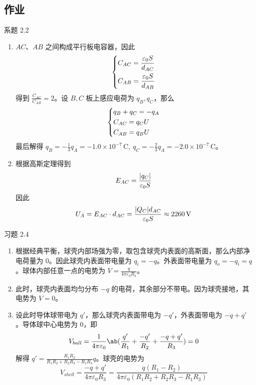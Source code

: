 \subsection{作业}

\begin{problem}
	系题 2.2
	\begin{solution}
		\begin{enumerate}
			
			\item[\textbf{1)}] $AC$、$AB$ 之间构成平行板电容器，因此
			$$
			\begin{dcases}
				C_{AC} = \frac{\varepsilon_0 S}{d_{AC}} \\
				C_{AB} = \frac{\varepsilon_0 S}{d_{AB}} \\
			\end{dcases}
			$$
			得到 $\frac{C_{AC}}{C_{AB}} = 2$。设 $B, C$ 板上感应电荷为 $q_B, q_C$，那么
			$$
			\begin{dcases}
				q_B + q_C = -q_A \\
				C_{AC} = q_C U \\
				C_{AB} = q_B U \\
			\end{dcases}
			$$
			最后解得 $q_B = -\frac{1}{3} q_A = -1.0 \times 10^{-7}\,\mathrm{C},\ q_C = -\frac{2}{3} q_A = -2.0 \times 10^{-7}\,\mathrm{C}$。
	
			\item[\textbf{2)}] 根据高斯定理得到
			$$
			E_{AC} = \frac{\abs{q_C}}{\varepsilon_0 S}
			$$
			因此
			$$
			U_A = E_{AC} \cdot d_{AC} = \frac{\abs{Q_C} d_{AC}}{\varepsilon_0 S} \approx 2260\,\mathrm{V}
			$$
		\end{enumerate}
	\end{solution}
\end{problem}

\begin{problem}
	习题 2.4
	\begin{solution}
		\begin{enumerate}
			\item[\textbf{1)}] 根据经典平衡，球壳内部场强为零，取包含球壳内表面的高斯面，那么内部净电荷量为 $0$。因此球壳内表面带电量为 $q_i = -q$。外表面带电量为 $q_o = -q_i = q$。球体内部任意一点的电势为 $V = \frac{q}{4\pi \varepsilon_0 R_3}$。
			
			\item[\textbf{2)}] 此时，球壳内表面均匀分布 $-q$ 的电荷，其余部分不带电。因为球壳接地，其电势为 $V = 0$。
			
			\item[\textbf{3)}] 设此时导体球带电为 $q'$，那么球壳内表面带电为 $-q'$，外表面带电为 $-q + q'$。导体球中心电势为 $0$，即
			$$
			V_{ball} = \frac{1}{4\pi \varepsilon_0} \ab(\frac{q'}{R_1} + \frac{-q'}{R_2} + \frac{-q + q'}{R_3}) = 0
			$$
			解得 $q' = \frac{R_1 R_2}{R_1 R_2 + R_2 R_3 - R_1 R_3} q$。球壳的电势为
			$$
			V_{shell} = \frac{-q + q'}{4\pi \varepsilon_0 R_3} = \frac{q(R_1 - R_2)}{4 \pi \varepsilon_0 (R_1 R_2 + R_2 R_3 - R_1 R_3)}
			$$
		\end{enumerate}
	\end{solution}
\end{problem}

